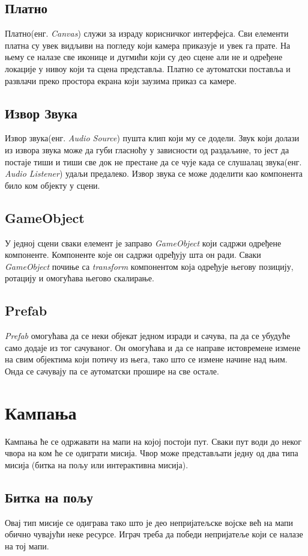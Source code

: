 \documentclass[11pt,a4paper]{article}
\begin{document}
\subsection{Платно}
Платно(енг. \emph{Canvas}) служи за израду корисничког интерфејса. Сви елементи платна су увек видљиви на погледу који камера приказује и увек га прате. На њему се налазе све иконице и дугмићи који су део сцене али не и одређене локације у нивоу који та сцена представља. Платно се аутоматски поставља и развлачи преко простора екрана који заузима приказ са камере.
\subsection{Извор Звука}
Извор звука(енг. \emph{Audio Source}) пушта клип који му се додели. Звук који долази из извора звука може да губи гласноћу у зависности од раздаљине, то јест да постаје тиши и тиши све док не престане да се чује када се слушалац звука(енг. \emph{Audio Listener}) удаљи предалеко. Извор звука се може доделити као компонента било ком објекту у сцени.
\subsection{GameObject}
У једној сцени сваки елемент је заправо \emph{GameObject} који садржи одређене компоненте. Компоненте које он садржи одређују шта он ради. Сваки  \emph{GameObject} почиње са \emph{transform} компонентом која одређује његову позицију, ротацију  и омогућава његово скалирање.
\subsection{Prefab}
\emph{Prefab} омогућава да се неки објекат једном изради и сачува, па да се убудуће само додаје из тог сачуваног. Он омогућава и да се направе истовремене измене на свим објектима који потичу из њега, тако што се измене начине над њим. Онда се сачувају па се аутоматски прошире на све остале. 
\newpage
\section{Кампања}
Кампања ће се одржавати на мапи на којој постоји пут. Сваки пут води до неког чвора на ком ће се одиграти мисија. Чвор може представљати једну од два типа мисија (битка на пољу или интерактивна мисија).
\subsection{Битка на пољу}
Овај тип мисије се одиграва тако што је део непријатељске војске већ на мапи обично чувајући неке ресурсе. Играч треба да победи непријатеље који се налазе на тој мапи.
\end{document}

